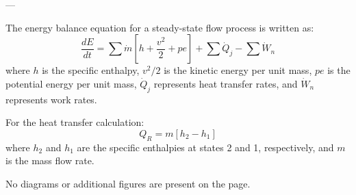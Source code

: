 ---

The energy balance equation for a steady-state flow process is written as:  
\[
\frac{dE}{dt} = \sum \dot{m} \left[ h + \frac{v^2}{2} + pe \right] + \sum \dot{Q}_j - \sum \dot{W}_n
\]  
where \( h \) is the specific enthalpy, \( v^2/2 \) is the kinetic energy per unit mass, \( pe \) is the potential energy per unit mass, \( \dot{Q}_j \) represents heat transfer rates, and \( \dot{W}_n \) represents work rates.  

For the heat transfer calculation:  
\[
Q_R = m \left[ h_2 - h_1 \right]
\]  
where \( h_2 \) and \( h_1 \) are the specific enthalpies at states 2 and 1, respectively, and \( m \) is the mass flow rate.  

No diagrams or additional figures are present on the page.